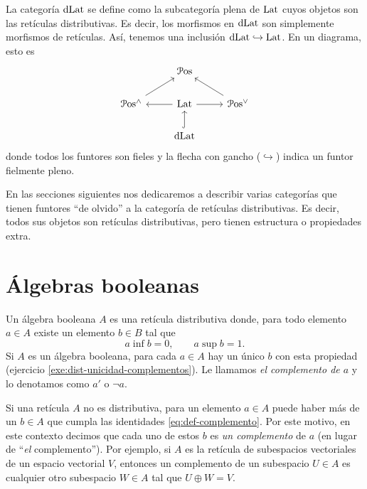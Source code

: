 La categoría $\mathrm{dLat}$ se define como la subcategoría plena de
$\mathrm{Lat}$ cuyos objetos son las retículas distributivas.
Es decir, los morfismos en $\mathrm{dLat}$ son simplemente morfismos de
retículas. Así, tenemos una inclusión $\mathrm{dLat}\hookrightarrow\mathrm{Lat}$.
En un diagrama, esto es
\[
    \begin{tikzcd}
        & \Pos \\
        \Pos^\wedge \arrow[ru]
            & \Lat \arrow[r] \arrow[l]
            & \Pos^\vee \arrow[lu] \\
        & \DLat \arrow[u,hook]
    \end{tikzcd}
\]
donde todos los funtores son fieles y la flecha con gancho
($\hookrightarrow$) indica un funtor fielmente pleno.

En las secciones siguientes nos dedicaremos a describir varias
categorías que tienen funtores ``de olvido'' a la categoría de
retículas distributivas. Es decir, todos sus objetos son retículas
distributivas, pero tienen estructura o propiedades extra.

\section{Álgebras booleanas}
\label{ss:complementos-algebras-booleanas}

\begin{definition}
  Un álgebra booleana $A$ es una retícula distributiva
  donde, para todo elemento $a\in A$ existe un elemento $b\in B$ tal
  que
  \begin{equation}\label{eq:def-complemento}
    a\inf b = 0, \qquad a\sup b = 1.
  \end{equation}
  Si $A$ es un álgebra booleana, para cada $a\in A$ hay un único $b$
  con esta propiedad (ejercicio \ref{exe:dist-unicidad-complementos}).
  Le llamamos \emph{el complemento de $a$} y lo denotamos como $a'$ o
  $\neg a$.
\end{definition}

Si una retícula $A$ no es distributiva, para un elemento $a\in A$
puede haber más de un $b\in A$ que cumpla las identidades
\ref{eq:def-complemento}. Por este motivo, en este contexto decimos
que cada uno de estos $b$ es \emph{un complemento} de $a$ (en lugar de
``\emph{el} complemento'').
Por ejemplo, si $A$ es la retícula de
subespacios vectoriales de un espacio vectorial $V$,
entonces un complemento de un subespacio $U\in A$ es cualquier otro
subespacio $W\in A$ tal que $U\oplus W=V$.

